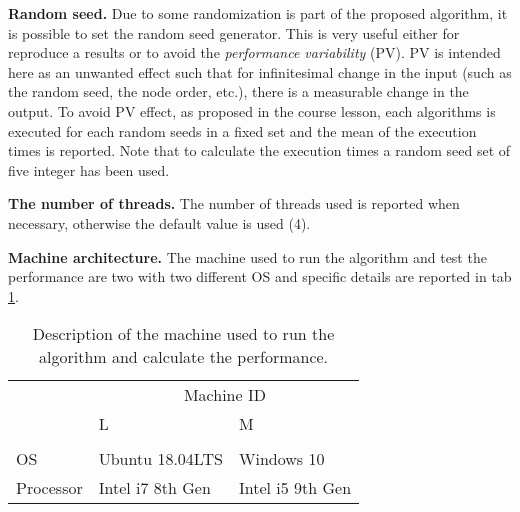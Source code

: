 \documentclass[10pt, english, openany]{report}
\begin{document}
\begin{appendices}
			\textbf{Random seed.} Due to some randomization is part of the proposed algorithm, it is possible to set the random seed generator. This is very useful either for reproduce a results or to avoid the \textit{performance variability} (PV). PV is intended here as an unwanted effect such that for infinitesimal change in the input (such as the random seed, the node order, etc.), there is a measurable change in the output. To avoid PV effect, as proposed in the course lesson, each algorithms is executed for each random seeds in a fixed set and the mean of the execution times is reported. Note that to calculate the execution times a random seed set of five integer has been used.
			
			\textbf{The number of threads.} The number of threads used is reported when necessary, otherwise the default value is used (4).
			
			\textbf{Machine architecture.} The machine used to run the algorithm and test the performance are two with two different OS and specific details are reported in tab \ref{tab:machines}.
			\begin{table}[h]
				\begin{center}
					\caption{Description of the machine used to run the algorithm and calculate the performance.}
					\label{tab:machines}
					\begin{tabular}{lll}
									&   \multicolumn{2}{c}{Machine ID} 	\\
						 			& L 				&	 M 			\\ \hline \\
						OS 			& Ubuntu 18.04LTS 	& Windows 10 	\\
						Processor	& Intel i7 8th Gen	&	Intel i5 9th Gen		\\
					\end{tabular}
				\end{center}
			\end{table}
	\end{appendices}
	

	
	
\end{document}
